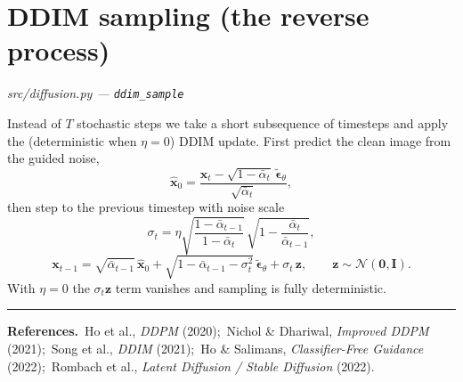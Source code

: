 \documentclass[11pt]{article}
\newcommand{\N}{\mathcal{N}}
\newcommand{\x}{\mathbf{x}}
\newcommand{\eps}{\boldsymbol{\epsilon}}
\newcommand{\ab}{\bar{\alpha}}          %
\begin{document}
\section{DDIM sampling (the reverse process)}
\hfill\textit{\small src/diffusion.py — \texttt{ddim\_sample}}

Instead of $T$ stochastic steps we take a short subsequence of timesteps and apply the
(deterministic when $\eta=0$) DDIM update. First predict the clean image from the guided noise,
\begin{equation}
  \hat{\x}_0 = \frac{\x_t - \sqrt{1-\ab_t}\,\tilde{\eps}_\theta}{\sqrt{\ab_t}},
\end{equation}
then step to the previous timestep with noise scale
\begin{equation}
  \sigma_t = \eta \sqrt{\frac{1-\ab_{t-1}}{1-\ab_t}}\,\sqrt{1 - \frac{\ab_t}{\ab_{t-1}}},
\end{equation}
\begin{equation}
  \boxed{\ \x_{t-1} = \sqrt{\ab_{t-1}}\,\hat{\x}_0
  + \sqrt{1 - \ab_{t-1} - \sigma_t^2}\,\tilde{\eps}_\theta
  + \sigma_t\,\mathbf{z}, \qquad \mathbf{z} \sim \N(\mathbf{0}, \mathbf{I}).\ }
\end{equation}
With $\eta = 0$ the $\sigma_t \mathbf{z}$ term vanishes and sampling is fully deterministic.

\vspace{1em}
\hrule
\vspace{0.6em}
\noindent\small\textbf{References.}\ Ho et al., \emph{DDPM} (2020);\ Nichol \& Dhariwal,
\emph{Improved DDPM} (2021);\ Song et al., \emph{DDIM} (2021);\ Ho \& Salimans,
\emph{Classifier-Free Guidance} (2022);\ Rombach et al., \emph{Latent Diffusion / Stable
Diffusion} (2022).
\end{document}
